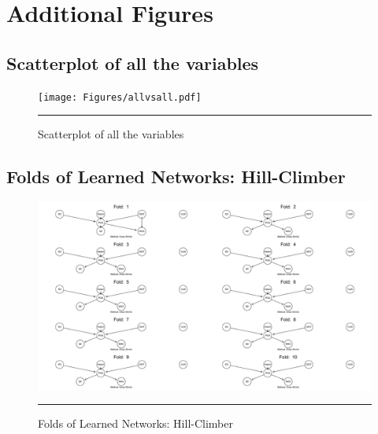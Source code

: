 \chapter{Additional Figures}

\newpage

\section{Scatterplot of all the variables} %

\label{AppendixA} %

\begin{figure}[htbp]%
	\centering
		\texttt{[image: Figures/allvsall.pdf]}
		\rule{35em}{0.5pt}
	\caption*{Scatterplot of all the variables}
\end{figure}

\newpage

\section{Folds of Learned Networks: Hill-Climber} %

\label{AppendixB} %

\begin{figure}[!htbp]%
	\centering
		\includegraphics[angle=90,scale = 0.5]{Figures/hc.pdf}
		\rule{35em}{0.5pt}
	\caption*{Folds of Learned Networks: Hill-Climber}
\end{figure}

